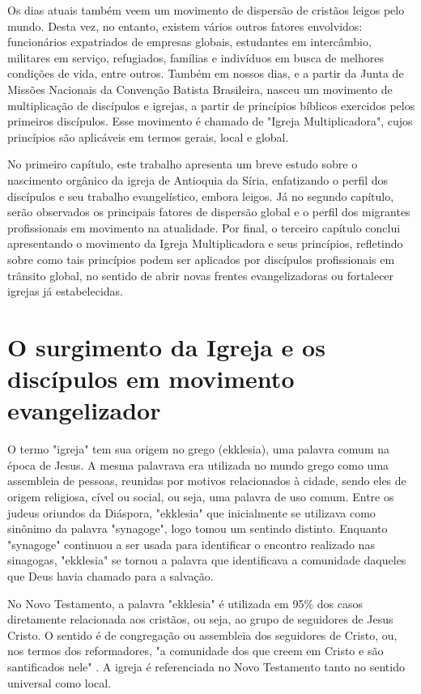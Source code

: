 \documentclass[12pt,openright,oneside,a4paper,
english,french,spanish,brazil]{abntex2}
\begin{document}
Os dias atuais também veem um movimento de dispersão de cristãos leigos pelo mundo. Desta vez, no entanto, existem vários outros fatores envolvidos:  funcionários expatriados de empresas globais, estudantes em intercâmbio, militares em serviço, refugiados, famílias e indivíduos em busca de melhores condições de vida, entre outros. Também em nossos dias, e a partir da Junta de Missões Nacionais da Convenção Batista Brasileira, nasceu um movimento de multiplicação de discípulos e igrejas, a partir de princípios bíblicos exercidos pelos primeiros discípulos. Esse movimento é chamado de "Igreja Multiplicadora", cujos princípios são aplicáveis em termos gerais, local e global.

No primeiro capítulo, este trabalho apresenta um breve estudo sobre o nascimento orgânico da igreja de Antioquia da Síria, enfatizando o perfil dos discípulos e seu trabalho evangelístico, embora leigos. Já no segundo capítulo, serão observados os principais fatores de dispersão global e o perfil dos migrantes profissionais em movimento na atualidade. Por final, o terceiro capítulo conclui apresentando o movimento da Igreja Multiplicadora e seus princípios, refletindo sobre como tais princípios podem ser aplicados por discípulos profissionais em trânsito global, no sentido de abrir novas frentes evangelizadoras ou fortalecer igrejas já estabelecidas.


\chapter{O surgimento da Igreja e os discípulos em movimento evangelizador}

O termo "igreja" tem sua origem no grego (ekklesia), uma palavra comum na época de Jesus. A mesma palavrava era utilizada no mundo grego como uma assembleia de pessoas, reunidas por motivos relacionados à cidade, sendo eles de origem religiosa, cível ou social, ou seja, uma palavra de uso comum\cite[p. 317]{zac}. Entre os judeus oriundos da Diáspora, "ekklesia" que inicialmente se utilizava como sinônimo da palavra "synagoge", logo tomou um sentindo distinto. Enquanto "synagoge" continuou a ser usada para identificar o encontro realizado nas sinagogas, "ekklesia" se tornou a palavra que identificava a comunidade daqueles que Deus havia chamado para a salvação\cite[p. 485]{bavinck}. 

No Novo Testamento, a palavra "ekklesia" é utilizada em 95\% dos casos diretamente relacionada aos cristãos, ou seja, ao grupo de seguidores de Jesus Cristo. O sentido é de congregação ou assembleia dos seguidores de Cristo, ou, nos termos dos reformadores, "a comunidade dos que creem em Cristo e são santificados nele" \cite[p. 318]{zac}. A igreja é referenciada no Novo Testamento tanto no sentido universal como local\cite[p. 318]{zac}.
\end{document}
